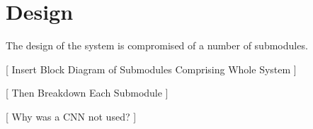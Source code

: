 \chapter{Design}

The design of the system is compromised of a number of submodules. 


[ Insert Block Diagram of Submodules Comprising Whole System ]


[ Then Breakdown Each Submodule ]

[ Why was a CNN not used? ]
